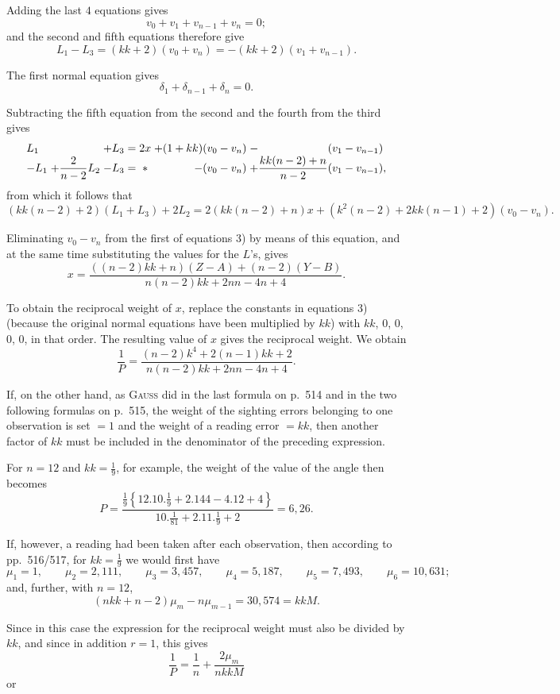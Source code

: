 Adding the last $4$ equations gives
\[
 v_0+v_1+v_{n-1}+v_n=0;
\]
and the second and fifth equations therefore give
\[
 L_1-L_3=(kk+2)(v_0+v_n)=-(kk+2)(v_1+v_{n-1}).
\]

The first normal equation gives
\[
 \delta_1+\delta_{n-1}+\delta_n=0.
\]

Subtracting the fifth equation from the second and the fourth from the third gives
\[
\begin{array}{@{}l@{\;}r@{\;}r@{\;}c@{\;}c@{\;}r@{\;}l@{}}
 L_1 && +L_3 &=& 2x & +(1+kk)(v_0-v_n) & -\hphantom{\dfrac{kk(n-2)+n}{n-2}}(v_1-v_{n-1})\\
 -L_1 & +\dfrac{2}{n-2}L_2 & -L_3 &=& * & -(v_0-v_n) & +\dfrac{kk(n-2)+n}{n-2}(v_1-v_{n-1}),
\end{array}
\]
from which it follows that
\[
 (kk(n-2)+2)(L_1+L_3)+2L_2=2(kk(n-2)+n)x+
 (k^2(n-2)+2kk(n-1)+2)(v_0-v_n).
\]

Eliminating $v_0-v_n$ from the first of equations 3) by means of this equation, and at the same time substituting the values for the $L$'s, gives
\[
 x=\frac{((n-2)kk+n)(Z-A)+(n-2)(Y-B)}{n(n-2)kk+2nn-4n+4}.
\]

To obtain the reciprocal weight of $x$, replace the constants in equations 3) (because the original normal equations have been multiplied by $kk$) with $kk$, $0$, $0$, $0$, $0$, in that order. The resulting value of $x$ gives the reciprocal weight. We obtain
\[
 \frac{1}{P}=\frac{(n-2)k^4+2(n-1)kk+2}{n(n-2)kk+2nn-4n+4}.
\]

If, on the other hand, as \textsc{Gauss} did in the last formula on p.~514 and in the two following formulas on p.~515, the weight of the sighting errors belonging to one observation is set $=1$ and the weight of a reading error $=kk$, then another factor of $kk$ must be included in the denominator of the preceding expression.

For $n=12$ and $kk=\frac19$, for example, the weight of the value of the angle then becomes
\[
 P=\frac{\frac19\left\{12.10.\frac19+2.144-4.12+4\right\}}{10.\frac{1}{81}+2.11.\frac19+2}
 =6{,}26.
\]

If, however, a reading had been taken after each observation, then according to pp.~516/517, for $kk=\frac19$ we would first have
\[
 \mu_1=1,\qquad \mu_2=2{,}111,\qquad \mu_3=3{,}457,\qquad
 \mu_4=5{,}187,\qquad \mu_5=7{,}493,\qquad \mu_6=10{,}631;
\]
and, further, with $n=12$,
\[
 (nkk+n-2)\mu_m-n\mu_{m-1}=30{,}574=kkM.
\]

Since in this case the expression for the reciprocal weight must also be divided by $kk$, and since in addition $r=1$, this gives
\[
 \frac{1}{P}=\frac{1}{n}+\frac{2\mu_m}{nkkM}
\]
or

